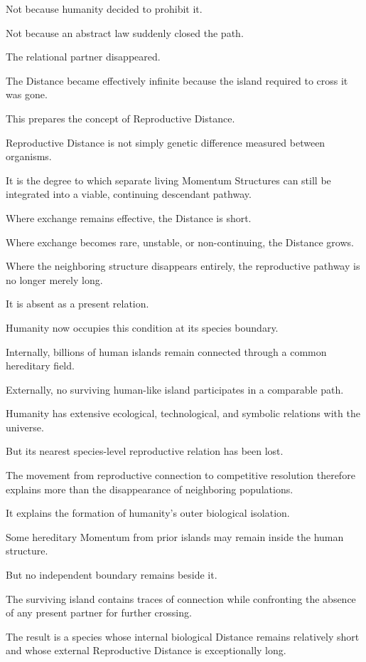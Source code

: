 Not because humanity decided to prohibit it.

Not because an abstract law suddenly closed the path.

The relational partner disappeared.

The Distance became effectively infinite because the island required to cross it was gone.

This prepares the concept of Reproductive Distance.

Reproductive Distance is not simply genetic difference measured between organisms.

It is the degree to which separate living Momentum Structures can still be integrated into a viable, continuing descendant pathway.

Where exchange remains effective, the Distance is short.

Where exchange becomes rare, unstable, or non-continuing, the Distance grows.

Where the neighboring structure disappears entirely, the reproductive pathway is no longer merely long.

It is absent as a present relation.

Humanity now occupies this condition at its species boundary.

Internally, billions of human islands remain connected through a common hereditary field.

Externally, no surviving human-like island participates in a comparable path.

Humanity has extensive ecological, technological, and symbolic relations with the universe.

But its nearest species-level reproductive relation has been lost.

The movement from reproductive connection to competitive resolution therefore explains more than the disappearance of neighboring populations.

It explains the formation of humanity’s outer biological isolation.

Some hereditary Momentum from prior islands may remain inside the human structure.

But no independent boundary remains beside it.

The surviving island contains traces of connection while confronting the absence of any present partner for further crossing.

The result is a species whose internal biological Distance remains relatively short and whose external Reproductive Distance is exceptionally long.

